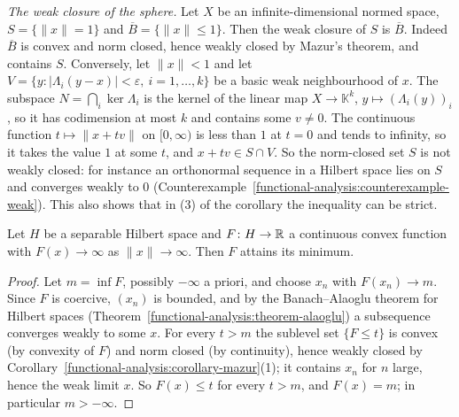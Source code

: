\begin{example}\label{functional-analysis:example-weak-closure-sphere}
\emph{The weak closure of the sphere.} Let $X$ be an infinite-dimensional normed space, $S = \{\|x\| = 1\}$ and $\overline{B} = \{\|x\| \leq 1\}$. Then the weak closure of $S$ is $\overline{B}$. Indeed $\overline{B}$ is convex
and norm closed, hence weakly closed by Mazur's theorem, and contains $S$. Conversely, let $\|x\| < 1$ and let $V = \{y : |\Lambda_i(y - x)| < \varepsilon, \ i = 1, \ldots, k\}$ be a basic weak neighbourhood of $x$.
The subspace $N = \bigcap_i\ker\Lambda_i$ is the kernel of the linear map $X \to \mathbb{K}^k$, $y \mapsto (\Lambda_i(y))_i$, so it has codimension at most $k$ and contains some $v \neq 0$. The continuous function
$t \mapsto \|x + tv\|$ on $[0, \infty)$ is less than $1$ at $t = 0$ and tends to infinity, so it takes the value $1$ at some $t$, and $x + tv \in S \cap V$. So the norm-closed set $S$ is not weakly closed: for
instance an orthonormal sequence in a Hilbert space lies on $S$ and converges weakly to $0$ (Counterexample~\ref{functional-analysis:counterexample-weak}). This also shows that in (3) of the corollary the
inequality can be strict.
\end{example}

\begin{proposition}\label{functional-analysis:proposition-direct-method}
Let $H$ be a separable Hilbert space and $F \colon H \to \mathbb{R}$ a continuous convex function with $F(x) \to \infty$ as $\|x\| \to \infty$. Then $F$ attains its minimum.
\end{proposition}

\begin{proof}
Let $m = \inf F$, possibly $-\infty$ a priori, and choose $x_n$ with $F(x_n) \to m$. Since $F$ is coercive, $(x_n)$ is bounded, and by the Banach--Alaoglu theorem for Hilbert spaces
(Theorem~\ref{functional-analysis:theorem-alaoglu}) a subsequence converges weakly to some $x$. For every $t > m$ the sublevel set $\{F \leq t\}$ is convex (by convexity of $F$) and norm closed (by
continuity), hence weakly closed by Corollary~\ref{functional-analysis:corollary-mazur}(1); it contains $x_n$ for $n$ large, hence the weak limit $x$. So $F(x) \leq t$ for every $t > m$, and $F(x) = m$; in particular
$m > -\infty$.
\end{proof}

